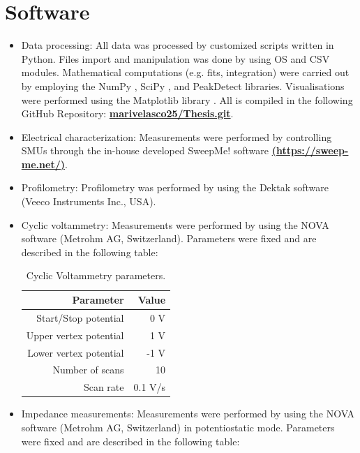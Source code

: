 \section{Software} \label{param}
\begin{itemize}
\item Data processing: All data was processed by customized scripts written in Python. Files import and manipulation was done by using OS \cite{os_module} and CSV \cite{csv_module} modules. Mathematical computations (e.g. fits, integration) were carried out by employing the NumPy \cite{numpy_2012}, SciPy \cite{scipy_linreg}, and PeakDetect \cite{peakdetect} libraries. Visualisations were performed using the Matplotlib library \cite{matplotlib_2012}. All is compiled in the following GitHub Repository: \href{https://github.com/marivelascoe25/Thesis.git}{\textbf{marivelasco25/Thesis.git}}.
\item Electrical characterization: Measurements were performed by controlling SMUs through the in-house developed SweepMe! software \href{https://sweep-me.net/}{\textbf{(https://sweep-me.net/)}}. 
\item Profilometry: Profilometry was performed by using the Dektak software (Veeco Instruments Inc., USA).
\item Cyclic voltammetry: Measurements were performed by using the NOVA software (Metrohm AG, Switzerland). Parameters were fixed and are described in the following table: 

\begin{table}[h]
	\centering
	\caption{Cyclic Voltammetry parameters.}
	\begin{tabular}{r r} \hline
		Parameter	& Value \\ \hline
		Start/Stop potential	& 0 V \\ 
		Upper vertex potential	& 1 V \\ 
		Lower vertex potential	& -1 V \\ 
		Number of scans	& 10 \\ 
		Scan rate	& 0.1 V/s \\ \hline
	\end{tabular}
	\label{tab:CV}
\end{table}

\item Impedance measurements: Measurements were performed by using the NOVA software (Metrohm AG, Switzerland) in potentiostatic mode. Parameters were fixed and are described in the following table: 


\end{itemize}
